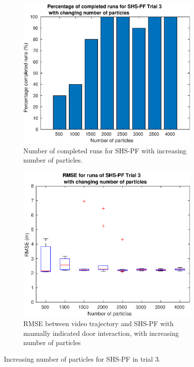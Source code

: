 \begin{figure}[H]	
	\centering
	\begin{subfigure}[t]{.4\textwidth}
		\centering
		\includegraphics[width=\linewidth]{images/20201129_1147_Trial_3_nr_particles_1}
		\caption{Number of completed runs for SHS-PF with increasing number of particles.}
		\label{fig:trial3_nr_particles_completed}
	\end{subfigure} \quad
\begin{subfigure}[t]{.4\textwidth}
	\centering
	\includegraphics[width=\linewidth]{images/20201129_1154_Trial_3_RMSE_nr_particles_1}
	\caption{RMSE between video trajectory and SHS-PF with manually indicated door interaction, with increasing number of particles}
	\label{fig:trial3_nr_particles_RMSE}
\end{subfigure}
\setlength{\belowcaptionskip}{-10pt}
\caption{Increasing number of particles for SHS-PF in trial 3.}
\label{fig:trial3_nr_particles}
\end{figure}

